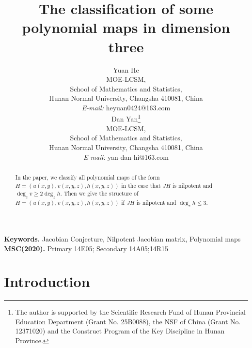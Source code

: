\documentclass[12pt, twoside, leqno]{article}
\theoremstyle{definition}
\numberwithin{equation}{section}
\begin{document}
\baselineskip=17pt



\title{The classification of some polynomial maps in dimension three}
\author{Yuan He\\ MOE-LCSM,\\ School of Mathematics and Statistics,\\ Hunan Normal University, Changsha 410081, China \\ \emph{E-mail:} heyuan0424@163.com \\ Dan Yan\footnote{ The author is supported by the Scientific Research Fund of Hunan Provincial Education Department (Grant No. 25B0088), the NSF of China (Grant No. 12371020) and the Construct Program of the Key Discipline in Hunan Province.}\\
MOE-LCSM,\\ School of Mathematics and Statistics,\\
 Hunan Normal University, Changsha 410081, China \\
\emph{E-mail:} yan-dan-hi@163.com \\
}
\date{}

\maketitle


\renewcommand{\thefootnote}{}

\renewcommand{\thefootnote}{\arabic{footnote}}
\setcounter{footnote}{0}

\begin{abstract} In the paper, we classify all
polynomial maps of the form $H=(u(x,y),\allowbreak v(x,y,z),h(x,y,z))$ in the
case that $JH$ is nilpotent and $\deg_zv\geq 2\deg_zh$. Then we give the structure of $H=(u(x,y),v(x,y,z),h(x,y,z))$ if $JH$ is nilpotent and $\deg_zh\leq 3$.
\end{abstract}
{\bf Keywords.} Jacobian Conjecture, Nilpotent Jacobian matrix, Polynomial maps\\
{\bf MSC(2020).} Primary 14E05;  Secondary 14A05;14R15 \vskip 2.5mm

\section{Introduction}
\end{document}

